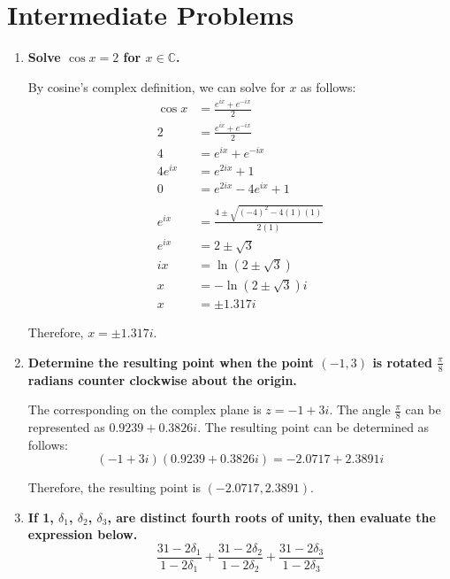 \documentclass[12pt]{article}
\begin{document}
\newpage

\section*{Intermediate Problems}
\begin{enumerate}
    \item \textbf{Solve $\cos{x} = 2$ for $x \in \mathbb{C}$.}
    
    By cosine's complex definition, we can solve for $x$ as follows:
    \begin{align*}
        \cos{x} &= \frac{e^{ix} + e^{-ix}}{2} \\
        2 &= \frac{e^{ix} + e^{-ix}}{2} \\
        4 &= e^{ix} + e^{-ix} \\
        4e^{ix} &= e^{2ix} + 1 \\
        0 &= e^{2ix} - 4e^{ix} + 1 \\ \\
        e^{ix} &= \frac{4 \pm \sqrt{(-4)^2 - 4(1)(1)}}{2(1)} \\
        e^{ix} &= 2 \pm \sqrt{3} \\
        ix &= \ln{(2 \pm \sqrt{3})} \\
        x &= -\ln{(2 \pm \sqrt{3})}i \\
        x &= \pm 1.317i
    \end{align*}
    
    Therefore, $x = \pm 1.317i$.
    
    \item \textbf{Determine the resulting point when the point $(-1, 3)$ is rotated $\frac{\pi}{8}$ radians counter clockwise about the origin.}
    
    The corresponding on the complex plane is $z = -1 + 3i$. The angle $\frac{\pi}{8}$ can be represented as $0.9239 + 0.3826i$. The resulting point can be determined as follows:
    \begin{equation*}
        (-1 + 3i)(0.9239 + 0.3826i) = -2.0717 + 2.3891i
    \end{equation*}
    
    Therefore, the resulting point is $(-2.0717, 2.3891)$.
    
    \item \textbf{If 1, $\delta_1$, $\delta_2$, $\delta_3$, are distinct fourth roots of unity, then evaluate the expression below.
    \begin{equation*}
        \frac{31 - 2\delta_1}{1 - 2\delta_1} + \frac{31 - 2\delta_2}{1 - 2\delta_2} +\frac{31 - 2\delta_3}{1 - 2\delta_3}
    \end{equation*}}
\end{enumerate}
\end{document}
